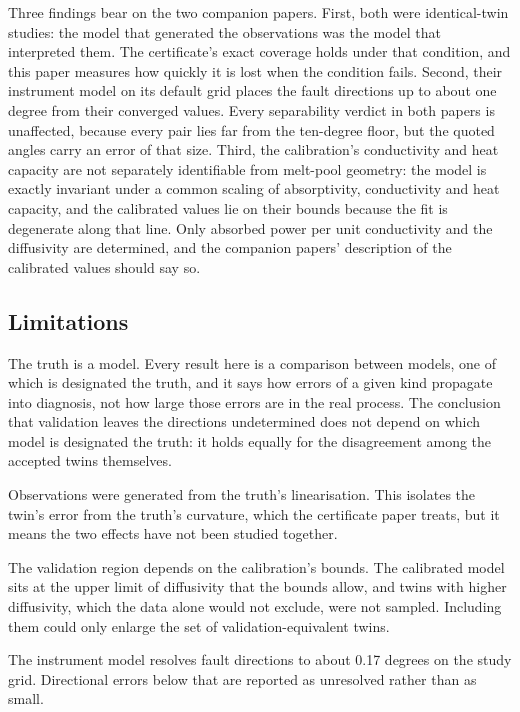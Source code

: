 \documentclass[preprint,12pt]{elsarticle}
\begin{document}
Three findings bear on the two companion papers. First, both were identical-twin
studies: the model that generated the observations was the model that
interpreted them. The certificate's exact coverage holds under that condition,
and this paper measures how quickly it is lost when the condition fails.
Second, their instrument model on its default grid places the fault directions
up to about one degree from their converged values. Every separability verdict
in both papers is unaffected, because every pair lies far from the ten-degree
floor, but the quoted angles carry an error of that size. Third, the
calibration's conductivity and heat capacity are not separately identifiable
from melt-pool geometry: the model is exactly invariant under a common scaling
of absorptivity, conductivity and heat capacity, and the calibrated values lie
on their bounds because the fit is degenerate along that line. Only absorbed
power per unit conductivity and the diffusivity are determined, and the
companion papers' description of the calibrated values should say so.

\subsection{Limitations}

The truth is a model. Every result here is a comparison between models, one of
which is designated the truth, and it says how errors of a given kind propagate
into diagnosis, not how large those errors are in the real process. The
conclusion that validation leaves the directions undetermined does not depend on
which model is designated the truth: it holds equally for the disagreement among
the accepted twins themselves.

Observations were generated from the truth's linearisation. This isolates the
twin's error from the truth's curvature, which the certificate paper treats, but
it means the two effects have not been studied together.

The validation region depends on the calibration's bounds. The calibrated model
sits at the upper limit of diffusivity that the bounds allow, and twins with
higher diffusivity, which the data alone would not exclude, were not sampled.
Including them could only enlarge the set of validation-equivalent twins.

The instrument model resolves fault directions to about 0.17 degrees on the
study grid. Directional errors below that are reported as unresolved rather
than as small.
\end{document}
